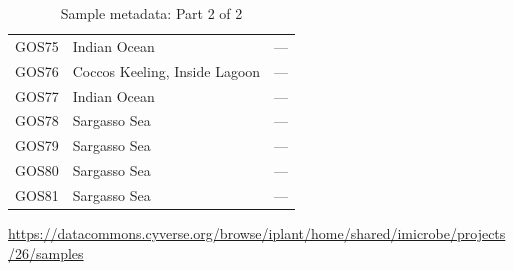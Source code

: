 \begin{table}[ht]
\begin{tabular}{|c|l|c|}
GOS75 & Indian Ocean               & --- \\
GOS76 & Coccos Keeling, Inside Lagoon & --- \\
GOS77 & Indian Ocean               & --- \\
GOS78 & Sargasso Sea               & --- \\
GOS79 & Sargasso Sea               & --- \\
GOS80 & Sargasso Sea               & --- \\
GOS81 & Sargasso Sea               & --- \\
\hline
\end{tabular}
\caption{Sample metadata: Part 2 of 2}
\label{tab:samples_part2}
\end{table}


\url{https://datacommons.cyverse.org/browse/iplant/home/shared/imicrobe/projects/26/samples}
